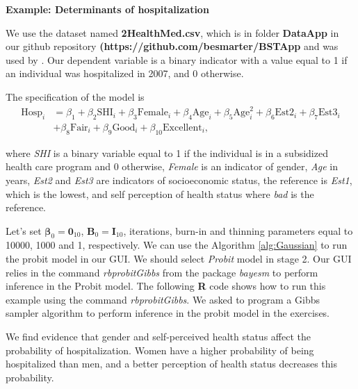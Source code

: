 \textbf{Example: Determinants of hospitalization}

We use the dataset named \textbf{2HealthMed.csv}, which is in folder \textbf{DataApp} in our github repository \textbf{(https://github.com/besmarter/BSTApp} and was used by \cite{Ramirez2013}. Our dependent variable is a binary indicator with a value equal to 1 if an individual was hospitalized in 2007, and 0 otherwise.

The specification of the model is
\begin{align*}
	\text{Hosp}_i&={\beta}_1+{\beta}_2\text{SHI}_i+{\beta}_3\text{Female}_i+{\beta}_4\text{Age}_i+{\beta}_5\text{Age}_i^2+{\beta}_6\text{Est2}_i+{\beta}_7\text{Est3}_i\\
	&+{\beta}_8\text{Fair}_i+{\beta}_9\text{Good}_i+{\beta}_{10}\text{Excellent}_i,
\end{align*}

where \textit{SHI} is a binary variable equal to 1 if the individual is in a subsidized health care program and 0 otherwise, \textit{Female} is an indicator of gender, \textit{Age} in years, \textit{Est2} and \textit{Est3} are indicators of socioeconomic status, the reference is \textit{Est1}, which is the lowest, and self perception of health status where \textit{bad} is the reference.

Let's set $\bm{\beta}_0={\bm{0}}_{10}$, ${\bm{B}}_0={\bm{I}}_{10}$, iterations, burn-in and thinning parameters equal to 10000, 1000 and 1, respectively. We can use the Algorithm \ref{alg:Gaussian} to run the probit model in our GUI. We should select \textit{Probit} model in stage 2. Our GUI relies in the command \textit{rbprobitGibbs} from the package \textit{bayesm} to perform inference in the Probit model. The following \textbf{R} code shows how to run this example using the command \textit{rbprobitGibbs}. We asked to program a Gibbs sampler algorithm to perform inference in the probit model in the exercises.

We find evidence that gender and self-perceived health status affect the probability of hospitalization. Women have a higher probability of being hospitalized than men, and a better perception of health status decreases this probability.

